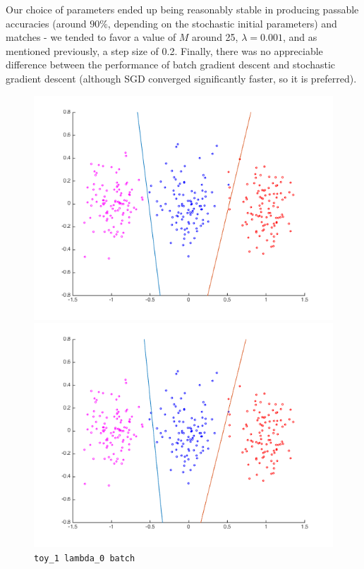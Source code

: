 \documentclass[11pt,letterpaper]{article}
\begin{document}
Our choice of parameters ended up being reasonably stable in producing passable accuracies (around $90\%$, depending on the stochastic initial parameters) and matches - we tended to favor a value of $M$ around 25, $\lambda=0.001$, and as mentioned previously, a step size of 0.2. Finally, there was no appreciable difference between the performance of batch gradient descent and stochastic gradient descent (although SGD converged significantly faster, so it is preferred).
\pagebreak

\begin{figure}[!htb]
  \includegraphics[width=\linewidth]{figures/batch_lambda0_toy.png}
  \caption{\texttt{toy\_1 lambda\_0 batch}}\label{fig:gradDifQ}
\endminipage\hfill
{}
  \includegraphics[width=\linewidth]{figures/batch_lambda1_toy.png}

\end{figure}
\end{document}
